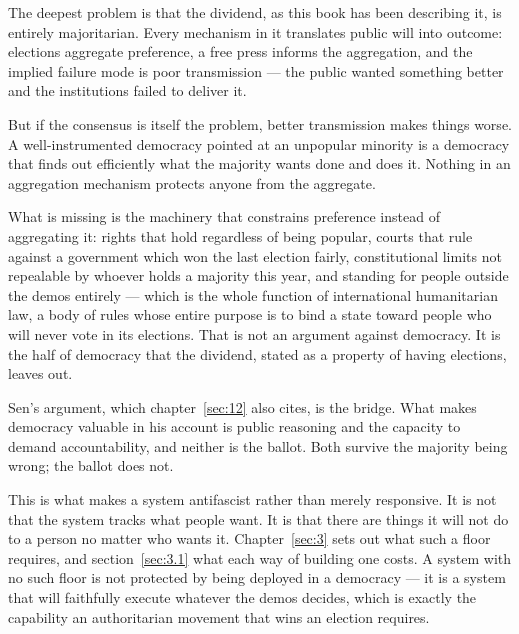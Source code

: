 The deepest problem is that the dividend, as this book has been describing it, is entirely majoritarian. Every mechanism in it translates public will into outcome: elections aggregate preference, a free press informs the aggregation, and the implied failure mode is poor transmission — the public wanted something better and the institutions failed to deliver it.

But if the consensus is itself the problem, better transmission makes things worse. A well-instrumented democracy pointed at an unpopular minority is a democracy that finds out efficiently what the majority wants done and does it. Nothing in an aggregation mechanism protects anyone from the aggregate.

What is missing is the machinery that constrains preference instead of aggregating it: rights that hold regardless of being popular, courts that rule against a government which won the last election fairly, constitutional limits not repealable by whoever holds a majority this year, and standing for people outside the demos entirely — which is the whole function of international humanitarian law, a body of rules whose entire purpose is to bind a state toward people who will never vote in its elections. That is not an argument against democracy. It is the half of democracy that the dividend, stated as a property of having elections, leaves out.

Sen's argument, which chapter~\ref{sec:12} also cites, is the bridge. What makes democracy valuable in his account is public reasoning and the capacity to demand accountability, and neither is the ballot. Both survive the majority being wrong; the ballot does not.

This is what makes a system antifascist rather than merely responsive. It is not that the system tracks what people want. It is that there are things it will not do to a person no matter who wants it. Chapter~\ref{sec:3} sets out what such a floor requires, and section~\ref{sec:3.1} what each way of building one costs. A system with no such floor is not protected by being deployed in a democracy — it is a system that will faithfully execute whatever the demos decides, which is exactly the capability an authoritarian movement that wins an election requires.
